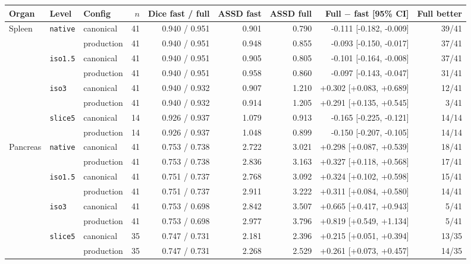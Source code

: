 \begin{tabular}{lllrrrrrr}
\toprule
Organ & Level & Config & $n$ & Dice fast / full & ASSD fast & ASSD full & Full $-$ fast [95\% CI] & Full better \\
\midrule
Spleen & \texttt{native} & canonical & 41 & 0.940 / 0.951 & 0.901 & 0.790 & -0.111 [-0.182, -0.009] & 39/41 \\
 &  & production & 41 & 0.940 / 0.951 & 0.948 & 0.855 & -0.093 [-0.150, -0.017] & 37/41 \\
 & \texttt{iso1.5} & canonical & 41 & 0.940 / 0.951 & 0.905 & 0.805 & -0.101 [-0.164, -0.008] & 37/41 \\
 &  & production & 41 & 0.940 / 0.951 & 0.958 & 0.860 & -0.097 [-0.143, -0.047] & 31/41 \\
 & \texttt{iso3} & canonical & 41 & 0.940 / 0.932 & 0.907 & 1.210 & +0.302 [+0.083, +0.689] & 12/41 \\
 &  & production & 41 & 0.940 / 0.932 & 0.914 & 1.205 & +0.291 [+0.135, +0.545] & 3/41 \\
 & \texttt{slice5} & canonical & 14 & 0.926 / 0.937 & 1.079 & 0.913 & -0.165 [-0.225, -0.121] & 14/14 \\
 &  & production & 14 & 0.926 / 0.937 & 1.048 & 0.899 & -0.150 [-0.207, -0.105] & 14/14 \\
\midrule
Pancreas & \texttt{native} & canonical & 41 & 0.753 / 0.738 & 2.722 & 3.021 & +0.298 [+0.087, +0.539] & 18/41 \\
 &  & production & 41 & 0.753 / 0.738 & 2.836 & 3.163 & +0.327 [+0.118, +0.568] & 17/41 \\
 & \texttt{iso1.5} & canonical & 41 & 0.751 / 0.737 & 2.768 & 3.092 & +0.324 [+0.102, +0.598] & 15/41 \\
 &  & production & 41 & 0.751 / 0.737 & 2.911 & 3.222 & +0.311 [+0.084, +0.580] & 14/41 \\
 & \texttt{iso3} & canonical & 41 & 0.753 / 0.698 & 2.842 & 3.507 & +0.665 [+0.417, +0.943] & 5/41 \\
 &  & production & 41 & 0.753 / 0.698 & 2.977 & 3.796 & +0.819 [+0.549, +1.134] & 5/41 \\
 & \texttt{slice5} & canonical & 35 & 0.747 / 0.731 & 2.181 & 2.396 & +0.215 [+0.051, +0.394] & 13/35 \\
 &  & production & 35 & 0.747 / 0.731 & 2.268 & 2.529 & +0.261 [+0.073, +0.457] & 14/35 \\
\bottomrule
\end{tabular}
